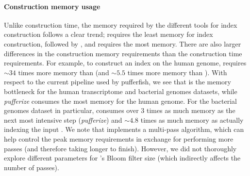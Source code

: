 \paragraph{Construction memory usage} Unlike construction time, the memory required by the different tools for index construction follows a clear trend; \bwa requires the least memory for index construction, followed by \pufferfish, and \kallisto requires the most memory.  There are also larger differences in the construction memory requirements than the construction time requirements.  For example, to construct an index on the human genome, \kallisto requires $\sim34$ times more memory than \bwa (and $\sim5.5$ times more memory than \pufferfish).  With respect to the current pipeline used by pufferfish, we see that \twopaco is the memory
bottleneck for the human transcriptome and bacterial genomes datasets, while \emph{pufferize} consumes the
most memory for the human genome. For the bacterial genomes dataset in particular, \twopaco consumes
over $3$ times as much memory as the next most intensive step (\emph{pufferize}) and $\sim4.8$ times as much memory
as actually indexing the input \ccdbg. We note that \twopaco implements a multi-pass
algorithm, which can help control the peak memory requirements in exchange for performing more
passes (and therefore taking longer to finish). However, we did not thoroughly explore different parameters for \twopaco's Bloom filter size (which indirectly affects the number of passes).

